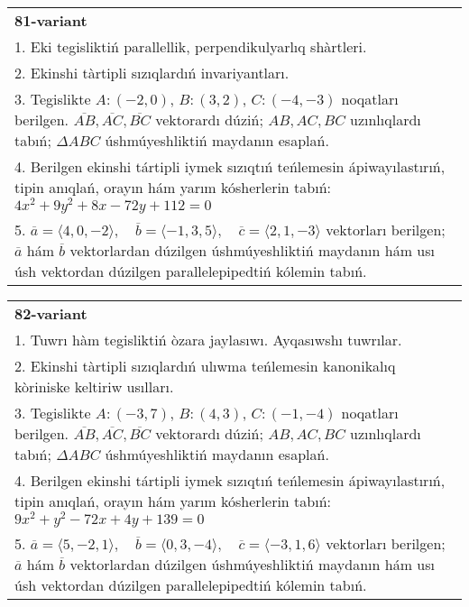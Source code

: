 \documentclass{article}
\begin{document}
\begin{tabular}{m{17cm}}
\textbf{81-variant}\\
1. Eki tegisliktiń parallellik, perpendikulyarlıq shàrtleri.\\

2. Ekinshi tàrtipli sızıqlardıń invariyantları.\\

3. Tegislikte $A: (-2, 0)$, $B: (3, 2)$, $C: (-4, -3)$ noqatları berilgen. $\overline{AB}, \overline{AC}, \overline{BC}$ vektorardı dúziń; $AB, AC, BC$ uzınlıqlardı tabıń; $\Delta ABC$ úshmúyeshliktiń maydanın esaplań. \\

4. Berilgen ekinshi tártipli iymek sızıqtıń teńlemesin ápiwayılastırıń, tipin anıqlań, orayın hám yarım kósherlerin tabıń: $4x^2+9y^2+8x-72y+112=0$\\

5. \(\overline{a} = \langle 4, 0, -2 \rangle, \quad \overline{b} = \langle -1, 3, 5 \rangle, \quad \overline{c} = \langle 2, 1, -3 \rangle\) vektorları berilgen; \(\overline{a}\) hám \(\overline{b}\) vektorlardan dúzilgen úshmúyeshliktiń maydanın hám usı úsh vektordan dúzilgen parallelepipedtiń kólemin tabıń.
\end{tabular}
\vspace{1cm}


\begin{tabular}{m{17cm}}
\textbf{82-variant}\\
1. Tuwrı hàm tegisliktiń òzara jaylasıwı. Ayqasıwshı tuwrılar.\\

2. Ekinshi tàrtipli sızıqlardıń ulıwma teńlemesin kanonikalıq kòriniske keltiriw usılları.\\

3. Tegislikte $A: (-3, 7)$, $B: (4, 3)$, $C: (-1, -4)$ noqatları berilgen. $\overline{AB}, \overline{AC}, \overline{BC}$ vektorardı dúziń; $AB, AC, BC$ uzınlıqlardı tabıń; $\Delta ABC$ úshmúyeshliktiń maydanın esaplań. \\

4. Berilgen ekinshi tártipli iymek sızıqtıń teńlemesin ápiwayılastırıń, tipin anıqlań, orayın hám yarım kósherlerin tabıń: $9x^2+y^2-72x+4y+139=0$\\

5. \(\overline{a} = \langle 5, -2, 1 \rangle, \quad \overline{b} = \langle 0, 3, -4 \rangle, \quad \overline{c} = \langle -3, 1, 6 \rangle\) vektorları berilgen; \(\overline{a}\) hám \(\overline{b}\) vektorlardan dúzilgen úshmúyeshliktiń maydanın hám usı úsh vektordan dúzilgen parallelepipedtiń kólemin tabıń.
\end{tabular}
\vspace{1cm}
\end{document}
